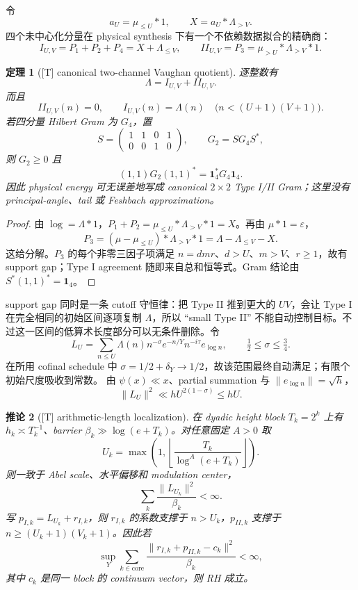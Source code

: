 \documentclass[UTF8,11pt,a4paper]{ctexart}
\newtheorem{theorem}{定理}[section]
\newtheorem{corollary}[theorem]{推论}
\theoremstyle{definition}
\theoremstyle{remark}
\newcommand{\1}{\mathbf 1}
\newcommand{\statusT}{\textnormal{[T]}}
\begin{document}
令
\[
 a_U=\mu_{\leq U}*1,\qquad X=a_U*\Lambda_{>V}.
\]
四个未中心化分量在 physical synthesis 下有一个不依赖数据拟合的精确商：
\[
 I_{U,V}=P_1+P_2+P_4=X+\Lambda_{\leq V},\qquad
 II_{U,V}=P_3=\mu_{>U}*\Lambda_{>V}*1.
\]

\begin{theorem}[\statusT{} canonical two-channel Vaughan quotient]\label{thm:two-vaughan}
逐整数有
\[
 \Lambda=I_{U,V}+II_{U,V}.
\]
而且
\[
 II_{U,V}(n)=0,\qquad
 I_{U,V}(n)=\Lambda(n)
 \quad\bigl(n<(U+1)(V+1)\bigr).
\]
若四分量 Hilbert Gram 为 $G_4$，置
\[
 S=\begin{pmatrix}1&1&0&1\\0&0&1&0\end{pmatrix},
 \qquad G_2=SG_4S^*,
\]
则 $G_2\geq0$ 且
\[
 (1,1)G_2(1,1)^*=\1_4^*G_4\1_4.
\]
因此 physical energy 可无误差地写成 canonical $2\times2$ Type I/II Gram；这里没有 principal-angle、tail 或 Feshbach approximation。
\end{theorem}

\begin{proof}
由 $\log=\Lambda*1$，$P_1+P_2=\mu_{\leq U}*\Lambda_{>V}*1=X$。再由 $\mu*1=\varepsilon$，
\[
 P_3=(\mu-\mu_{\leq U})*\Lambda_{>V}*1
    =\Lambda-\Lambda_{\leq V}-X.
\]
这给分解。$P_3$ 的每个非零三因子项满足 $n=dmr$、$d>U$、$m>V$、$r\geq1$，故有 support gap；Type I agreement 随即来自总和恒等式。Gram 结论由 $S^*(1,1)^*=\1_4$。
\end{proof}

support gap 同时是一条 cutoff 守恒律：把 Type II 推到更大的 $UV$，会让 Type I 在完全相同的初始区间逐项复制 $\Lambda$，所以 ``small Type II'' 不能自动控制目标。不过这一区间的低算术长度部分可以无条件删除。令
\[
 L_U=\sum_{n\leq U}\Lambda(n)n^{-\sigma}e^{-n/Y}n^{-i\tau}e_{\log n},
 \qquad \tfrac12\leq\sigma\leq\tfrac34.
\]
在所用 cofinal schedule 中 $\sigma=1/2+\delta_Y\to1/2$，故该范围最终自动满足；有限个初始尺度吸收到常数。
由 $\psi(x)\ll x$、partial summation 与 $\|e_{\log n}\|=\sqrt h$，
\[
 \|L_U\|^2\ll hU^{2(1-\sigma)}\leq hU.           \tag{*}
\]

\begin{corollary}[\statusT{} arithmetic-length localization]\label{cor:length-local}
在 dyadic height block $T_k=2^k$ 上有 $h_k\asymp T_k^{-1}$、barrier $\beta_k\gg\log(e+T_k)$。对任意固定 $A>0$ 取
\[
 U_k=\max\!\left(1,\left\lfloor
 \frac{T_k}{\log^A(e+T_k)}\right\rfloor\right).
\]
则一致于 Abel scale、水平偏移和 modulation center，
\[
 \sum_k\frac{\|L_{U_k}\|^2}{\beta_k}<\infty.
\]
写 $p_{I,k}=L_{U_k}+r_{I,k}$，则 $r_{I,k}$ 的系数支撑于 $n>U_k$，$p_{II,k}$ 支撑于 $n\geq(U_k+1)(V_k+1)$。因此若
\[
 \sup_Y\sum_{k\in\mathrm{core}}
 \frac{\|r_{I,k}+p_{II,k}-c_k\|^2}{\beta_k}<\infty,              \tag{**}
\]
其中 $c_k$ 是同一 block 的 continuum vector，则 RH 成立。
\end{corollary}
\end{document}
